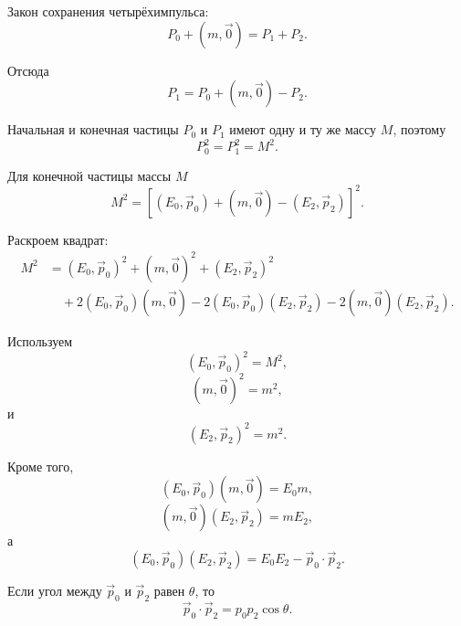 \documentclass[../final.tex]{subfiles}
\begin{document}
Закон сохранения четырёхимпульса:
%
\begin{equation*}
    P_0+(m,\vec 0)
    =
    P_1+P_2.
\end{equation*}

Отсюда
%
\begin{equation*}
    P_1
    =
    P_0+(m,\vec 0)-P_2.
\end{equation*}

Начальная и конечная частицы $P_0$ и $P_1$
имеют одну и ту же массу $M$, поэтому
%
\begin{equation*}
    P_0^2=P_1^2=M^2.
\end{equation*}

Для конечной частицы массы $M$
%
\begin{equation*}
    M^2
    =
    \left[
        (E_0,\vec p_0)
        +
        (m,\vec 0)
        -
        (E_2,\vec p_2)
    \right]^2.
\end{equation*}

Раскроем квадрат:
%
\begin{align*}
    M^2
    &=
    (E_0,\vec p_0)^2
    +
    (m,\vec 0)^2
    +
    (E_2,\vec p_2)^2
    \\[3pt]
    &\quad
    +
    2(E_0,\vec p_0)(m,\vec 0)
    -
    2(E_0,\vec p_0)(E_2,\vec p_2)
    -
    2(m,\vec 0)(E_2,\vec p_2).
\end{align*}

Используем
%
\begin{equation*}
    (E_0,\vec p_0)^2=M^2,
\end{equation*}
%
\begin{equation*}
    (m,\vec 0)^2=m^2,
\end{equation*}
%
и
%
\begin{equation*}
    (E_2,\vec p_2)^2=m^2.
\end{equation*}

Кроме того,
%
\begin{equation*}
    (E_0,\vec p_0)(m,\vec 0)
    =
    E_0m,
\end{equation*}
%
\begin{equation*}
    (m,\vec 0)(E_2,\vec p_2)
    =
    mE_2,
\end{equation*}
%
а
%
\begin{equation*}
    (E_0,\vec p_0)(E_2,\vec p_2)
    =
    E_0E_2-\vec p_0\cdot\vec p_2.
\end{equation*}

Если угол между $\vec p_0$ и $\vec p_2$ равен $\theta$, то
%
\begin{equation*}
    \vec p_0\cdot\vec p_2
    =
    p_0p_2\cos\theta.
\end{equation*}
\end{document}
